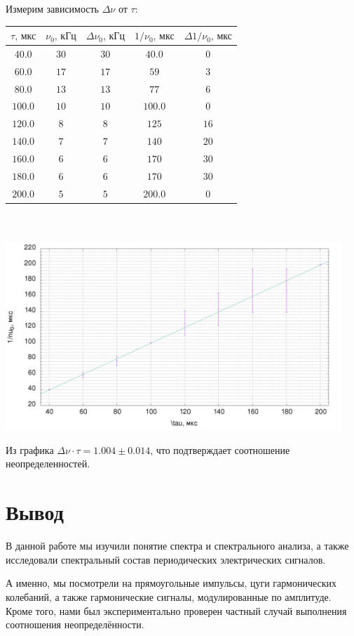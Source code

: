 \documentclass[a4paper,12pt]{article} %
\begin{document}
Измерим зависимость $\Delta \nu$ от $\tau$:
\begin{center}
\begin{tabular}{|c|c|c|c|c|}\hline
$\tau\text{, мкс}$&$\nu_0\text{, кГц}$&$\Delta \nu_0\text{, кГц}$&$1/\nu_0\text{, мкс}$&$\Delta 1/\nu_0\text{, мкс}$\\\hline
$40.0$&$30$&$30$&$40.0$&$0$\\\hline
$60.0$&$17$&$17$&$59$&$3$\\\hline
$80.0$&$13$&$13$&$77$&$6$\\\hline
$100.0$&$10$&$10$&$100.0$&$0$\\\hline
$120.0$&$8$&$8$&$125$&$16$\\\hline
$140.0$&$7$&$7$&$140$&$20$\\\hline
$160.0$&$6$&$6$&$170$&$30$\\\hline
$180.0$&$6$&$6$&$170$&$30$\\\hline
$200.0$&$5$&$5$&$200.0$&$0$\\\hline
\end{tabular}\\~\\
\includegraphics[width=0.95\textwidth]{data.png}
\end{center}

Из графика $\Delta \nu \cdot \tau = 1.004\pm0.014$, что подтверждает соотношение неопределенностей.
\section{Вывод}
В данной работе мы изучили понятие спектра и спектрального анализа, а также исследовали спектральный состав периодических электрических сигналов. 

А именно, мы посмотрели на прямоугольные импульсы, цуги гармонических колебаний, а также гармонические сигналы, модулированные по амплитуде. Кроме того, нами был экспериментально проверен частный случай выполнения соотношения неопределённости. 
  	
\end{document}
